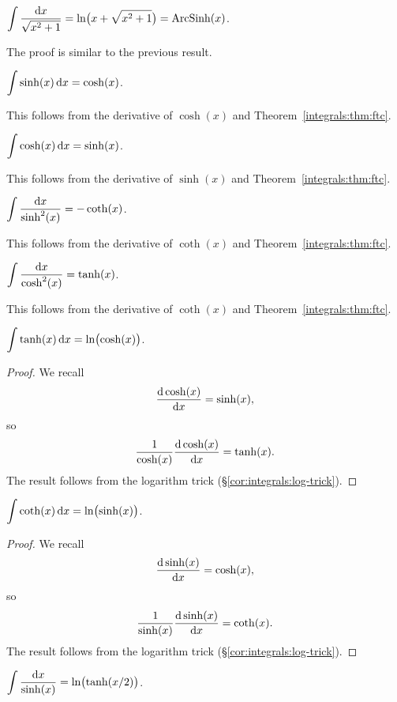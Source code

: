 \M $\displaystyle{\int\frac{\mathrm{d}x}{\sqrt{x^{2} + 1}} = \ln\bigl(x + \sqrt{x^{2}+1}\bigr)=\operatorname{ArcSinh}(x)}$.

The proof is similar to the previous result.

\M $\displaystyle{\int\sinh(x)\,\mathrm{d}x = \cosh(x)}$.

This follows from the derivative of $\cosh(x)$ and Theorem~\ref{integrals:thm:ftc}.

\M $\displaystyle{\int\cosh(x)\,\mathrm{d}x = \sinh(x)}$.

This follows from the derivative of $\sinh(x)$ and Theorem~\ref{integrals:thm:ftc}.

\M $\displaystyle{\int\frac{\mathrm{d}x}{\sinh^{2}(x)} = -\coth(x)}$.

This follows from the derivative of $\coth(x)$ and Theorem~\ref{integrals:thm:ftc}.

\M $\displaystyle{\int\frac{\mathrm{d}x}{\cosh^{2}(x)} = \tanh(x)}$.

This follows from the derivative of $\coth(x)$ and Theorem~\ref{integrals:thm:ftc}.

\M $\displaystyle{\int\tanh(x)\,\mathrm{d}x = \ln\bigl(\cosh(x)\bigr)}$.

\begin{proof}
  We recall
  \begin{equation}
\frac{\mathrm{d}\cosh(x)}{\mathrm{d} x}=\sinh(x),
  \end{equation}
  so
  \begin{equation}
\frac{1}{\cosh(x)}\frac{\mathrm{d}\cosh(x)}{\mathrm{d} x}=\tanh(x).
  \end{equation}
The result follows from the logarithm trick (\S\ref{cor:integrals:log-trick}).
\end{proof}

\M $\displaystyle{\int\coth(x)\,\mathrm{d}x = \ln\bigl(\sinh(x)\bigr)}$.
\begin{proof}
  We recall
  \begin{equation}
\frac{\mathrm{d}\sinh(x)}{\mathrm{d} x}=\cosh(x),
  \end{equation}
  so
  \begin{equation}
\frac{1}{\sinh(x)}\frac{\mathrm{d}\sinh(x)}{\mathrm{d} x}=\coth(x).
  \end{equation}
The result follows from the logarithm trick (\S\ref{cor:integrals:log-trick}).
\end{proof}

\M $\displaystyle{\int\frac{\mathrm{d}x}{\sinh(x)} = \ln\bigl(\tanh(x/2)\bigr)}$.


